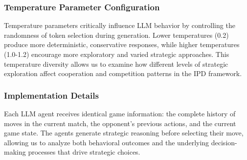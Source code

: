 \subsubsection{Temperature Parameter Configuration}
Temperature parameters critically influence LLM behavior by controlling the randomness of token selection during generation. Lower temperatures (0.2) produce more deterministic, conservative responses, while higher temperatures (1.0-1.2) encourage more exploratory and varied strategic approaches. This temperature diversity allows us to examine how different levels of strategic exploration affect cooperation and competition patterns in the IPD framework.

\subsubsection{Implementation Details}
Each LLM agent receives identical game information: the complete history of moves in the current match, the opponent's previous actions, and the current game state. The agents generate strategic reasoning before selecting their move, allowing us to analyze both behavioral outcomes and the underlying decision-making processes that drive strategic choices.
